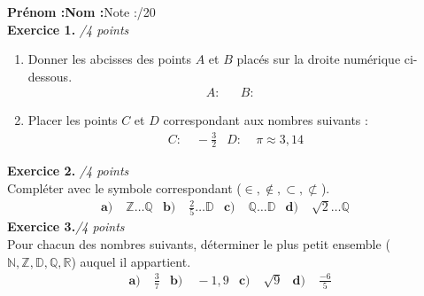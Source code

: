 \documentclass[11pt]{article}
\begin{document}
\noindent\textbf{Prénom :}\hfill\textbf{Nom :}\hfill Note
:\hspace{1.5cm}/20\vspace{.5cm}\\
\textbf{Exercice 1.} \hspace{2cm}\emph{/4 points}\\
\begin{enumerate}
  \item Donner les abcisses des points $A$ et $B$ placés sur la droite
numérique ci-dessous.
\begin{align*}
  A:& &
  B:& &
\end{align*}
  \item Placer les points $C$ et  $D$ correspondant aux nombres suivants :
    \begin{align*}
      C:&\; -\frac{3}{2} &
      D:&\; \pi\approx3,14 &
    \end{align*}
\end{enumerate}
\begin{center}
\end{center}
\noindent \textbf{Exercice 2.} \hspace{2cm}\emph{/4 points}\\
Compléter avec le symbole correspondant ($\in, \notin, \subset, \not\subset$).
\begin{align*}
  \textbf{a)}\; & \mathbb{Z} \ldots \mathbb{Q} &
  \textbf{b)}\; & \frac{2}{5} \ldots \mathbb{D} &
  \textbf{c)}\; & \mathbb{Q} \ldots \mathbb{D} &
  \textbf{d)}\; & \sqrt 2 \ldots \mathbb{Q} &
\end{align*}
\textbf{Exercice 3.}\hspace{2cm}\emph{/4 points}\\
{\small Pour chacun des nombres suivants, déterminer le plus petit ensemble
($\mathbb{N}, \mathbb{Z}, \mathbb{D}, \mathbb{Q}, \mathbb{R}$) auquel il
appartient.}
\begin{align*}
  \textbf{a)}&\;\frac{3}{7} &
  \textbf{b)}&\;-1,9 &
  \textbf{c)}&\;\sqrt{9} &
  \textbf{d)}&\;\frac{-6}{5}
\end{align*}
\end{document}
